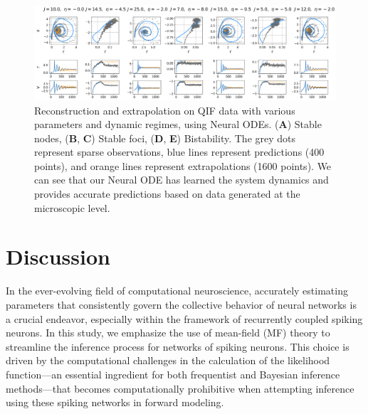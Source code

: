 \documentclass[preprint,11pt,authoryear]{elsarticle}
\begin{document}





\begin{figure}
    \centering
    \includegraphics[width=\linewidth]{Figs/Fig10.png}
    \caption{Reconstruction and extrapolation on QIF data with various parameters and dynamic regimes, using Neural ODEs. (\textbf{A}) Stable nodes, (\textbf{B}, \textbf{C}) Stable foci, (\textbf{D}, \textbf{E}) Bistability. The grey dots represent sparse  observations, blue lines represent predictions (400 points), and orange lines represent extrapolations (1600 points). We can see that our Neural ODE has learned the system dynamics and provides accurate predictions based on data generated at the microscopic level.} 
    \label{fig:NeuralODE_QIF}
\end{figure}



\section{Discussion}

In the ever-evolving field of computational neuroscience, accurately estimating parameters that consistently govern the collective behavior of neural networks is a crucial endeavor, especially within the framework of recurrently coupled spiking neurons. In this study, we emphasize the use of mean-field (MF) theory to streamline the inference process for networks of spiking neurons. This choice is driven by the computational challenges in the calculation of the likelihood function---an essential ingredient for both frequentist and Bayesian inference methods---that becomes computationally prohibitive when attempting inference using these spiking networks in forward modeling.
\end{document}
